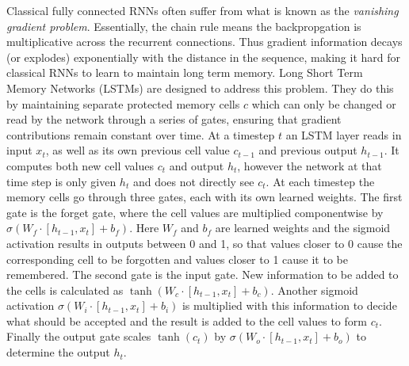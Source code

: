 \documentclass{article}
\numberwithin{figure}{section}
\theoremstyle{definition}
\begin{document}
Classical fully connected RNNs often suffer from what is known as the \textit{vanishing gradient problem}. %
Essentially, the chain rule means the backpropgation is multiplicative across the recurrent connections.
Thus gradient information decays (or explodes) exponentially with the distance in the sequence, making it hard for classical RNNs to learn to maintain long term memory. 
Long Short Term Memory Networks (LSTMs) are designed to address this problem.
They do this by maintaining separate protected memory cells $c$ which can only be changed or read by the network through a series of gates, ensuring that gradient contributions remain constant over time.
At a timestep $t$ an LSTM layer reads in input $x_t$, as well as its own previous cell value $c_{t-1}$ and previous output $h_{t-1}$.
It computes both new cell values $c_t$ and output $h_t$, however the network at that time step is only given $h_t$ and does not directly see $c_t$.
At each timestep the memory cells go through three gates, each with its own learned weights.
The first gate is the forget gate, where the cell values are multiplied componentwise by $\sigma( W_f\cdot [h_{t-1},x_t]+b_f)$.
Here $W_f$ and $b_f$ are learned weights and the sigmoid activation results in outputs between 0 and 1, so that values closer to 0 cause the corresponding cell to be forgotten and values closer to 1 cause it to be remembered.
The second gate is the input gate.
New information to be added to the cells is calculated as $\tanh( W_c\cdot [h_{t-1},x_t]+b_c)$.
Another sigmoid activation $\sigma( W_i\cdot [h_{t-1},x_t]+b_i)$ is multiplied with this information to decide what should be accepted and the result is added to the cell values to form $c_t$.
Finally the output gate scales $\tanh(c_t)$ by $\sigma( W_o\cdot [h_{t-1},x_t]+b_o)$ to determine the output $h_t$.
\end{document}
